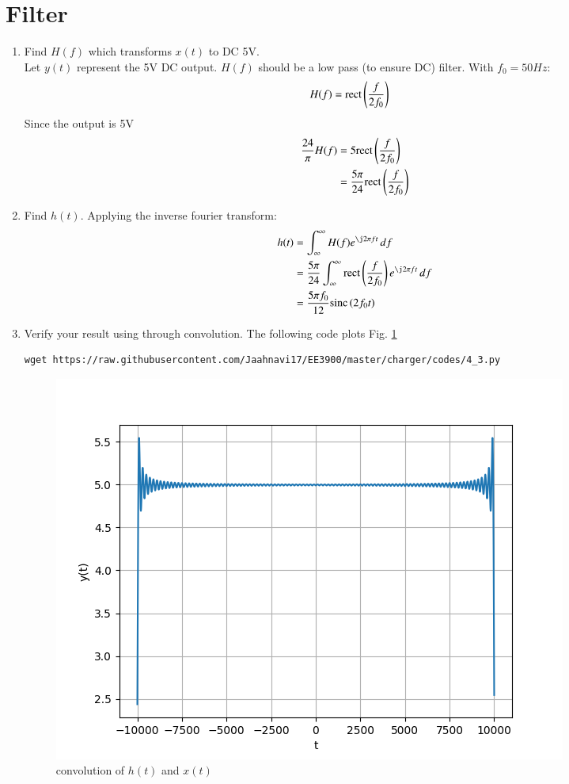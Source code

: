 \documentclass[journal,12pt,twocolumn]{IEEEtran}
\renewcommand\thesection{\arabic{section}}
\begin{document}
\section{Filter}
\begin{enumerate}[label=\thesection.\arabic*
,ref=\thesection.\theenumi]
\item Find $H(f)$ which transforms $x(t)$ to DC 5V.\\\solution Let $y(t)$ represent the 5V DC output. $H(f)$ should be a low pass (to ensure DC) filter. With $f_0 = 50Hz$:
\begin{align}
    H(f) &= \text{rect}\left(\frac{f}{2f_0}\right)
\end{align}
Since the output is 5V
\begin{align}
    \frac{24}{\pi}H(f) &= 5\text{rect}\left(\frac{f}{2f_0}\right)\\
    &= \frac{5\pi}{24}\text{rect}\left(\frac{f}{2f_0}\right)
\end{align}
\item Find $h(t)$.
Applying the inverse fourier transform:
\begin{align}
    h(t) &= \int_\infty^\infty H(f)e^{\j2\pi ft}\,df\\
    &= \frac{5\pi}{24}\int_\infty^\infty \rect{\frac{f}{2f_0}}e^{\j2\pi ft}\,df\\
    &= \frac{5\pi f_0}{12}\sinc{2f_0t}
\end{align}
\item Verify your result using  through convolution.
  The following code plots Fig. \ref{fig:conv-ft}
	\begin{lstlisting}
wget https://raw.githubusercontent.com/Jaahnavi17/EE3900/master/charger/codes/4_3.py
\end{lstlisting}
	\begin{figure}[h!]
	    \centering
	    \includegraphics[width=\columnwidth]{figures/conv-hx.png}
	    \caption{convolution of $h(t)$ and $x(t)$ }
	    \label{fig:conv-ft}
	\end{figure}

\end{enumerate}
\end{document}
